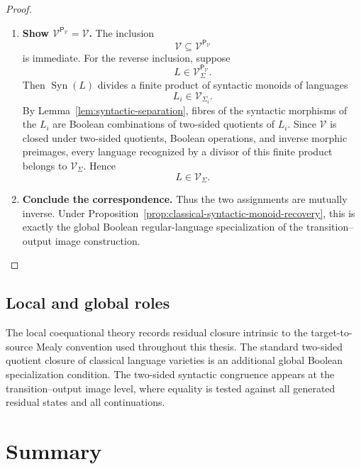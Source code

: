 \begin{proof}
\begin{enumerate}
        \item \textbf{Show \(\mathcal V^{\mathsf P_{\mathcal V}}=\mathcal V\).}
        The inclusion
        \[
            \mathcal V\subseteq \mathcal V^{\mathsf P_{\mathcal V}}
        \]
        is immediate. For the reverse inclusion, suppose
        \[
            L\in\mathcal V^{\mathsf P_{\mathcal V}}_\Sigma.
        \]
        Then \(\operatorname{Syn}(L)\) divides a finite product of syntactic
        monoids of languages
        \[
            L_i\in\mathcal V_{\Sigma_i}.
        \]
        By Lemma~\ref{lem:syntactic-separation}, fibres of the syntactic
        morphisms of the \(L_i\) are Boolean combinations of two-sided quotients
        of \(L_i\). Since \(\mathcal V\) is closed under two-sided quotients,
        Boolean operations, and inverse morphic preimages, every language
        recognized by a divisor of this finite product belongs to
        \(\mathcal V_\Sigma\). Hence
        \[
            L\in\mathcal V_\Sigma.
        \]

        \item \textbf{Conclude the correspondence.}
        Thus the two assignments are mutually inverse. Under
        Proposition~\ref{prop:classical-syntactic-monoid-recovery}, this is
        exactly the global Boolean regular-language specialization of the
        transition--output image construction.
    \end{enumerate}
\end{proof}

\subsection{Local and global roles}
\label{subsec:local-global-roles}

\begin{remark}
\label{rem:local-global-recovery}
    The local coequational theory records residual closure intrinsic to the
    target-to-source Mealy convention used throughout this thesis. The standard
    two-sided quotient closure of classical language varieties is an additional
    global Boolean specialization condition. The two-sided syntactic congruence
    appears at the transition--output image level, where equality is tested
    against all generated residual states and all continuations.
\end{remark}

\section{Summary}
\label{sec:coequations-syntactic-images-summary}

